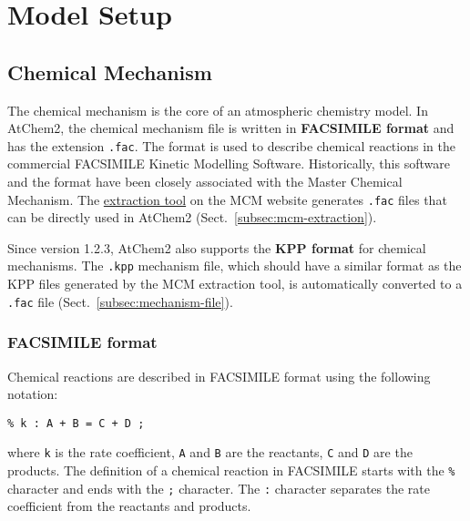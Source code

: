 %
%
%
%

\chapter{Model Setup} \label{ch:setup}

\section{Chemical Mechanism} \label{sec:chemical-mechanism}

The chemical mechanism is the core of an atmospheric chemistry
model. In AtChem2, the chemical mechanism file is written in
\textbf{FACSIMILE format} and has the extension \texttt{.fac}. The
format is used to describe chemical reactions in the commercial
FACSIMILE Kinetic Modelling Software. Historically, this software and
the format have been closely associated with the Master Chemical Mechanism.
The \href{https://mcm.york.ac.uk/MCM/export}{extraction tool} on the
MCM website generates \texttt{.fac} files that can be directly used in
AtChem2 (Sect.~\ref{subsec:mcm-extraction}).

Since version 1.2.3, AtChem2 also supports the \textbf{KPP format} for
chemical mechanisms. The \texttt{.kpp} mechanism file, which should
have a similar format as the KPP files generated by the MCM extraction
tool, is automatically converted to a \texttt{.fac} file
(Sect.~\ref{subsec:mechanism-file}).

\subsection{FACSIMILE format} \label{subsec:facsimile-format}

Chemical reactions are described in FACSIMILE format using the
following notation:

\begin{verbatim}
% k : A + B = C + D ;
\end{verbatim}

where \texttt{k} is the rate coefficient, \texttt{A} and \texttt{B}
are the reactants, \texttt{C} and \texttt{D} are the products. The
definition of a chemical reaction in FACSIMILE starts with the
\texttt{\%} character and ends with the \texttt{;} character. The
\texttt{:} character separates the rate coefficient from the reactants
and products.

